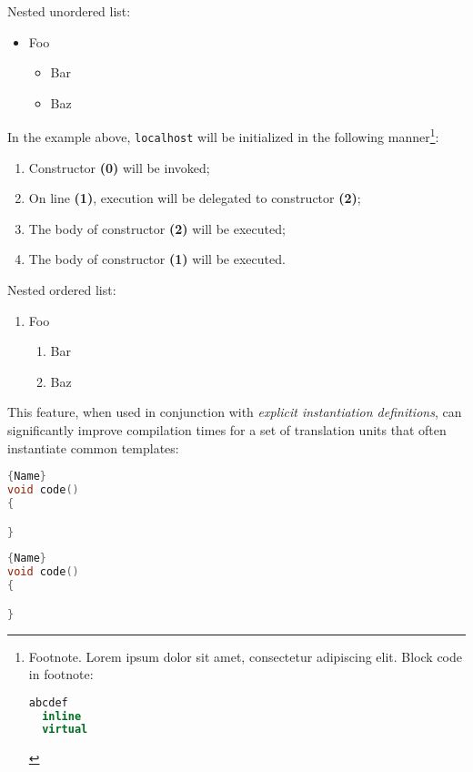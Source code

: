\documentclass[twoside,10pt,letterpaper,usenames]{newstyle-PearsonGeneric-7-38}
\begin{document}
Nested unordered list:

\begin{itemize}
\item{Foo\begin{itemize}
\item{Bar}
\item{Baz}
\end{itemize}
}
\end{itemize}

In the example above, \texttt{localhost} will be initialized in the
following manner{\cprotect\footnote{Footnote. Lorem ipsum dolor sit
  amet, consectetur adipiscing elit. Block code in footnote:

  \begin{lstlisting}[language=C++, label={testlabel}, basicstyle={\ttfamily\footnotesize}]
  abcdef
  inline
  virtual
  \end{lstlisting}
      }}:

\begin{enumerate}
\item{Constructor \textbf{(0)} will be invoked;}
\item{On line \textbf{(1)}, execution will be delegated to constructor \textbf{(2)};}
\item{The body of constructor \textbf{(2)} will be executed;}
\item{The body of constructor \textbf{(1)} will be executed.}
\end{enumerate}

Nested ordered list:

\begin{enumerate}
\item{Foo\begin{enumerate}
\item{Bar}
\item{Baz}
\end{enumerate}
}
\end{enumerate}

This feature, when used in conjunction with \emph{explicit instantiation
definitions}, can significantly improve compilation times for a set of
translation units that often instantiate common templates:

\noindent\begin{minipage}{.45\textwidth}
\begin{lstlisting}[language=C++, caption=code 1,frame=tb]{Name}
void code()
{

}
\end{lstlisting}
\end{minipage}\hfill
\begin{minipage}{.45\textwidth}
\begin{lstlisting}[language=C++, caption=code 2,frame=tb]{Name}
void code()
{

}
\end{lstlisting}
\end{minipage}
\end{document}
